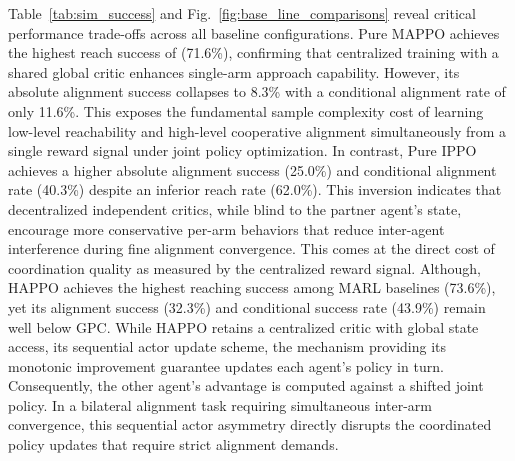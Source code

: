 \documentclass[a4paper,fleqn]{cas-dc}
\begin{document}
Table~\ref{tab:sim_success} and Fig.~\ref{fig:base_line_comparisons} reveal critical performance trade-offs across all baseline configurations. Pure MAPPO achieves the highest reach success of (71.6\%), confirming that centralized training with a shared global critic enhances single-arm approach capability. However, its absolute alignment success collapses to 8.3\% with a conditional alignment rate of only 11.6\%. This exposes the fundamental sample complexity cost of learning low-level reachability and high-level cooperative alignment simultaneously from a single reward signal under joint policy optimization. In contrast, Pure IPPO achieves a higher absolute alignment success (25.0\%) and conditional alignment rate (40.3\%) despite an inferior reach rate (62.0\%). This inversion indicates that decentralized independent critics, while blind to the partner agent's state, encourage more conservative per-arm behaviors that reduce inter-agent interference during fine alignment convergence. This comes at the direct cost of coordination quality as measured by the centralized reward signal. Although, HAPPO achieves the highest reaching success among MARL baselines (73.6\%), yet its alignment success (32.3\%) and conditional success rate (43.9\%) remain well below GPC. While HAPPO retains a centralized critic with global state access, its sequential actor update scheme, the mechanism providing its monotonic improvement guarantee updates each agent's policy in turn. Consequently, the other agent's advantage is computed against a shifted joint policy. In a bilateral alignment task requiring simultaneous inter-arm convergence, this sequential actor asymmetry directly disrupts the coordinated policy updates that require strict alignment demands.
\end{document}
